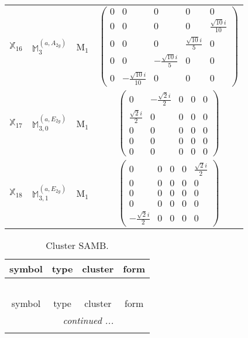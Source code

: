 \documentclass[fleqn,10pt,landscape]{article}
\begin{document}
\begin{itemize}
\begin{center}
\begin{longtable}{c|c|c|c}
$ \mathbb{X}_{16} $ & $\mathbb{M}_{3}^{(a,A_{2g})}$ & M$_{1}$ & $\begin{pmatrix} 0 & 0 & 0 & 0 & 0 \\ 0 & 0 & 0 & 0 & \frac{\sqrt{10} i}{10} \\ 0 & 0 & 0 & \frac{\sqrt{10} i}{5} & 0 \\ 0 & 0 & - \frac{\sqrt{10} i}{5} & 0 & 0 \\ 0 & - \frac{\sqrt{10} i}{10} & 0 & 0 & 0 \end{pmatrix}$ \\
$ \mathbb{X}_{17} $ & $\mathbb{M}_{3,0}^{(a,E_{2g})}$ & M$_{1}$ & $\begin{pmatrix} 0 & - \frac{\sqrt{2} i}{2} & 0 & 0 & 0 \\ \frac{\sqrt{2} i}{2} & 0 & 0 & 0 & 0 \\ 0 & 0 & 0 & 0 & 0 \\ 0 & 0 & 0 & 0 & 0 \\ 0 & 0 & 0 & 0 & 0 \end{pmatrix}$ \\
$ \mathbb{X}_{18} $ & $\mathbb{M}_{3,1}^{(a,E_{2g})}$ & M$_{1}$ & $\begin{pmatrix} 0 & 0 & 0 & 0 & \frac{\sqrt{2} i}{2} \\ 0 & 0 & 0 & 0 & 0 \\ 0 & 0 & 0 & 0 & 0 \\ 0 & 0 & 0 & 0 & 0 \\ - \frac{\sqrt{2} i}{2} & 0 & 0 & 0 & 0 \end{pmatrix}$ \\
\end{longtable}
\end{center}
\begin{center}
\renewcommand{\arraystretch}{1.3}
\begin{longtable}{c|c|c|c}
\caption{Cluster SAMB.}
 \\
 \hline \hline
symbol & type & cluster & form \\ \hline \endfirsthead

\multicolumn{3}{l}{\tablename\ \thetable{}} \\
 \hline \hline
symbol & type & cluster & form \\ \hline \endhead

 \hline \hline
\multicolumn{3}{r}{\footnotesize\it continued ...} \\ \endfoot


\end{longtable}
\end{center}
\end{itemize}
\end{document}
